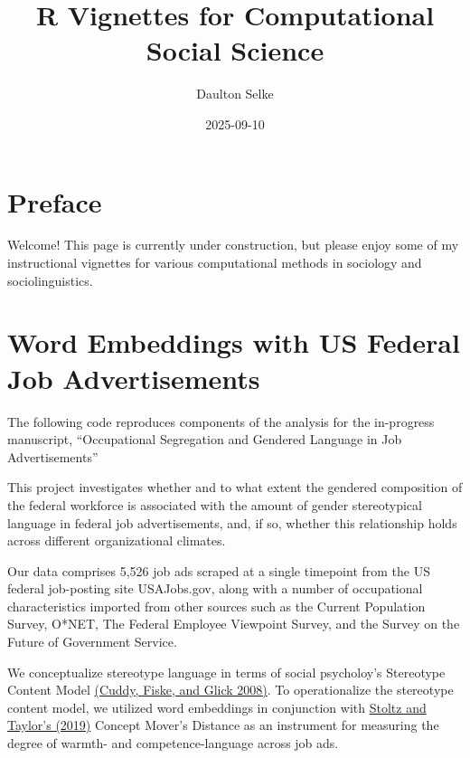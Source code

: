 \documentclass[
  letterpaper,
  DIV=11,
  numbers=noendperiod]{scrreprt}
\title{R Vignettes for Computational Social Science}
\author{Daulton Selke}
\date{2025-09-10}
\renewcommand*\contentsname{Table of contents}
\newcommand\contentsname{Table of contents}
\begin{document}
\maketitle

\renewcommand*\contentsname{Table of contents}
{
\hypersetup{linkcolor=}
\setcounter{tocdepth}{2}
\tableofcontents
}


\chapter*{Preface}\label{preface}


Welcome! This page is currently under construction, but please enjoy
some of my instructional vignettes for various computational methods in
sociology and sociolinguistics.


\chapter{Word Embeddings with US Federal Job
Advertisements}\label{word-embeddings-with-us-federal-job-advertisements}

The following code reproduces components of the analysis for the
in-progress manuscript, ``Occupational Segregation and Gendered Language
in Job Advertisements''

This project investigates whether and to what extent the gendered
composition of the federal workforce is associated with the amount of
gender stereotypical language in federal job advertisements, and, if so,
whether this relationship holds across different organizational
climates.

Our data comprises 5,526 job ads scraped at a single timepoint from the
US federal job-posting site USAJobs.gov, along with a number of
occupational characteristics imported from other sources such as the
Current Population Survey, O*NET, The Federal Employee Viewpoint Survey,
and the Survey on the Future of Government Service.

We conceptualize stereotype language in terms of social psycholoy's
Stereotype Content Model
\href{https://www.sciencedirect.com/science/article/pii/S0065260107000020?casa_token=HABSzi8Y7JMAAAAA:LBi45HX4KWxLfP4LLjsP8ySkpW1JtcZBNl67r55dZjmKbzsggVNarS--N6Y9XWdcn_q3zGfTI_c}{(Cuddy,
Fiske, and Glick 2008)}. To operationalize the stereotype content model,
we utilized word embeddings in conjunction with
\href{https://link.springer.com/article/10.1007/s42001-019-00048-6}{Stoltz
and Taylor's (2019)} Concept Mover's Distance as an instrument for
measuring the degree of warmth- and competence-language across job ads.
\end{document}
